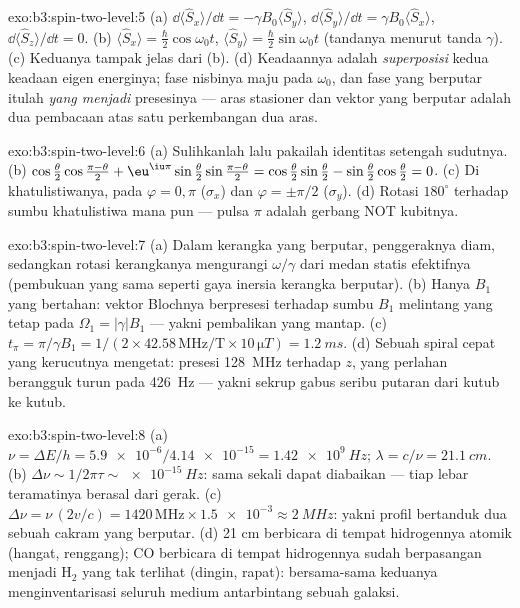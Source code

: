\begin{solution}{exo:b3:spin-two-level:5}
(a) $\dd\langle\hat S_x\rangle/\dd t = -\gamma B_0\langle\hat
S_y\rangle$, $\dd\langle\hat S_y\rangle/\dd t = \gamma
B_0\langle\hat S_x\rangle$, $\dd\langle\hat S_z\rangle/\dd t = 0$.
(b) $\langle\hat S_x\rangle = \tfrac\hbar2\cos\omega_0t$,
$\langle\hat S_y\rangle = \tfrac\hbar2\sin\omega_0t$ (tandanya menurut
tanda $\gamma$). (c) Keduanya tampak jelas dari (b). (d) Keadaannya
adalah \emph{superposisi} kedua keadaan eigen energinya; fase nisbinya
maju pada $\omega_0$, dan fase yang berputar itulah \emph{yang menjadi}
presesinya ---
aras stasioner dan vektor yang berputar adalah dua pembacaan atas satu
perkembangan dua aras.
\end{solution}

\begin{solution}{exo:b3:spin-two-level:6}
(a) Sulihkanlah lalu pakailah identitas setengah sudutnya. (b)
$\cos\tfrac\theta2\cos\tfrac{\pi-\theta}2 +
\eu^{\iu\pi}\sin\tfrac\theta2\sin\tfrac{\pi-\theta}2 =
\cos\tfrac\theta2\sin\tfrac\theta2 -
\sin\tfrac\theta2\cos\tfrac\theta2 = 0$. (c) Di khatulistiwanya, pada
$\varphi = 0, \pi$ ($\sigma_x$) dan $\varphi = \pm\pi/2$
($\sigma_y$). (d) Rotasi $180^\circ$ terhadap sumbu khatulistiwa mana
pun --- pulsa $\pi$  adalah gerbang NOT kubitnya.
\end{solution}

\begin{solution}{exo:b3:spin-two-level:7}
(a) Dalam kerangka yang berputar, penggeraknya diam, sedangkan rotasi
kerangkanya mengurangi $\omega/\gamma$ dari medan statis efektifnya
(pembukuan yang sama seperti gaya inersia kerangka berputar). (b) Hanya
$B_1$ yang bertahan: vektor Blochnya berpresesi terhadap sumbu $B_1$
melintang yang tetap pada $\Omega_1 = |\gamma|B_1$ --- yakni
pembalikan yang mantap. (c) $t_\pi = \pi/\gamma B_1 = 1/(2 \times 42.58\,\text{
MHz/T} \times 10\,\unit{\micro T}) = \qty{1.2}{ms}$. (d) Sebuah spiral
cepat yang kerucutnya mengetat: presesi \qty{128}{MHz} terhadap $z$,
yang perlahan berangguk turun pada \qty{426}{Hz} --- yakni sekrup gabus
seribu putaran dari kutub ke kutub.
\end{solution}

\begin{solution}{exo:b3:spin-two-level:8}
(a) $\nu = \Delta E/h = \num{5.9e-6}/\num{4.14e-15} =
\qty{1.42e9}{Hz}$; $\lambda = c/\nu = \qty{21.1}{cm}$. (b) $\Delta
\nu \sim 1/2\pi\tau \sim \qty{e-15}{Hz}$: sama sekali dapat diabaikan
--- tiap lebar teramatinya berasal dari gerak. (c) $\Delta\nu =
\nu\,(2v/c) = 1420\,\text{MHz} \times \num{1.5e-3} \approx
\qty{2}{MHz}$: yakni profil bertanduk dua sebuah cakram yang berputar. (d)
21 cm berbicara di tempat hidrogennya atomik (hangat, renggang);
CO berbicara di tempat hidrogennya sudah berpasangan menjadi H$_2$
yang tak terlihat (dingin, rapat): bersama-sama keduanya
menginventarisasi seluruh medium antarbintang sebuah galaksi.
\end{solution}

